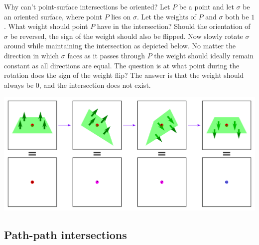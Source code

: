 \documentclass{book}
\begin{document}
Why can't point-surface intersections be oriented? Let \(P\) be a point and let \(\sigma\) be an oriented surface, where point \(P\) lies on \(\sigma\). Let the weights of \(P\) and \(\sigma\) both be \(1\). What weight should point \(P\) have in the intersection? Should the orientation of \(\sigma\) be reversed, the sign of the weight should also be flipped. Now slowly rotate \(\sigma\) around while maintaining the intersection as depicted below. No matter the direction in which \(\sigma\) faces as it passes through \(P\) the weight should ideally remain constant as all directions are equal. The question is at what point during the rotation does the sign of the weight flip? The answer is that the weight should always be \(0\), and the intersection does not exist.  

\begin{center}
\includegraphics[width = \textwidth]{Intersections/Undefined_intersections/point_surface_intersection_contradiction_2}
\end{center}



\subsection{Path-path intersections}
\end{document}
